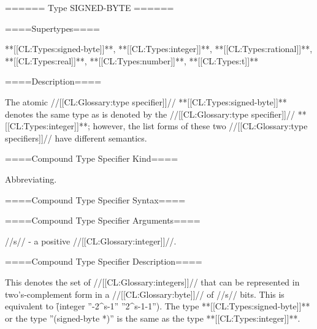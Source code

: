 ====== Type SIGNED-BYTE ======

====Supertypes====

**[[CL:Types:signed-byte]]**, **[[CL:Types:integer]]**, **[[CL:Types:rational]]**, **[[CL:Types:real]]**, **[[CL:Types:number]]**, **[[CL:Types:t]]**

====Description====

The atomic //[[CL:Glossary:type specifier]]// **[[CL:Types:signed-byte]]** denotes the same type as is denoted by the //[[CL:Glossary:type specifier]]// **[[CL:Types:integer]]**; however, the list forms of these two //[[CL:Glossary:type specifiers]]// have different semantics.

====Compound Type Specifier Kind====

Abbreviating.

====Compound Type Specifier Syntax====


====Compound Type Specifier Arguments====

//s// - a positive //[[CL:Glossary:integer]]//.

====Compound Type Specifier Description====

This denotes the set of //[[CL:Glossary:integers]]// that can be represented in two's-complement form in a //[[CL:Glossary:byte]]// of //s// bits. This is equivalent to \f{(integer ''-2^{s-1}'' ''2^{s-1}-1'')}. The type **[[CL:Types:signed-byte]]** or the type ''(signed-byte *)'' is the same as the type **[[CL:Types:integer]]**.

